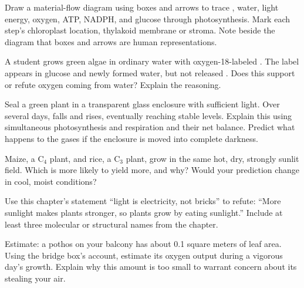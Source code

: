 \begin{sikaoti}
\item Draw a material-flow diagram using boxes and arrows to trace , water, light energy, oxygen, ATP, NADPH, and glucose through photosynthesis. Mark each step's chloroplast location, thylakoid membrane or stroma. Note beside the diagram that boxes and arrows are human representations.
\item A student grows green algae in ordinary water with oxygen-18-labeled . The label appears in glucose and newly formed water, but not released . Does this support or refute oxygen coming from water? Explain the reasoning.
\item Seal a green plant in a transparent glass enclosure with sufficient light. Over several days,  falls and  rises, eventually reaching stable levels. Explain this using simultaneous photosynthesis and respiration and their net balance. Predict what happens to the gases if the enclosure is moved into complete darkness.
\item Maize, a C$_4$ plant, and rice, a C$_3$ plant, grow in the same hot, dry, strongly sunlit field. Which is more likely to yield more, and why? Would your prediction change in cool, moist conditions?
\item Use this chapter's statement ``light is electricity, not bricks'' to refute: ``More sunlight makes plants stronger, so plants grow by eating sunlight.'' Include at least three molecular or structural names from the chapter.
\item Estimate: a pothos on your balcony has about 0.1 square meters of leaf area. Using the bridge box's account, estimate its oxygen output during a vigorous day's growth. Explain why this amount is too small to warrant concern about its stealing your air.
\end{sikaoti}
